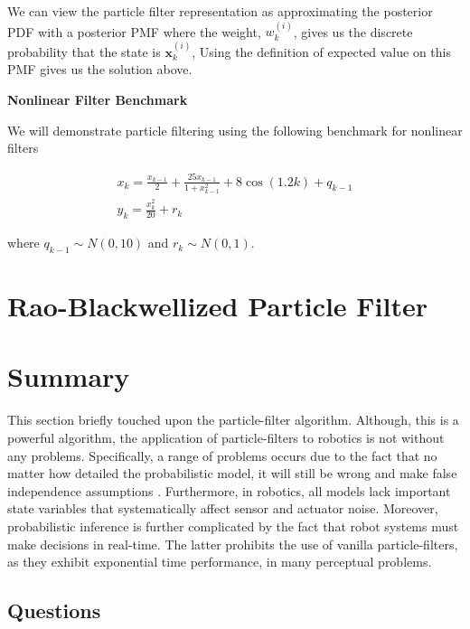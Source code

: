 We can view the particle filter representation as approximating the posterior PDF with a posterior PMF where the weight, $w_{k}^{(i)}$, 
gives us the discrete probability that the state is $\mathbf{x}_{k}^{(i)}$, Using the definition of expected value on this PMF gives us the solution above.


\begin{framed}
\begin{exmp}{\textbf{Nonlinear Filter Benchmark}}

We will demonstrate particle filtering using the following benchmark for nonlinear filters

\begin{eqnarray}
x_k = \frac{x_{k-1}}{2} + \frac{25x_{k-1}}{1 + x_{k-1}^2} + 8 \cos(1.2k) + q_{k-1} \\
y_k = \frac{x_{k}^2}{20} + r_k
\end{eqnarray}

where $q_{k-1}\sim N(0,10)$ and $r_k \sim N(0,1)$.
\end{exmp}
\end{framed}

\section{Rao-Blackwellized Particle Filter}
\label{rao_blackwellized_particle_filter}


\section{Summary}

This section briefly touched upon the particle-filter algorithm. Although, this is a powerful algorithm, the application
of particle-filters to robotics is not without any problems. Specifically, a range of problems occurs due to  the fact that no
matter how detailed the probabilistic model, it will still be wrong and make false independence assumptions \cite{Thurn2002}. 
Furthermore, in robotics,
all models lack important state variables that systematically affect sensor and actuator noise. Moreover, 
probabilistic inference is further complicated by the fact that robot systems must make decisions in real-time. The latter 
prohibits the use of vanilla particle-filters, as they exhibit exponential time performance, in many perceptual problems.


\subsection{Questions}
\label{questions_particle_filters}

